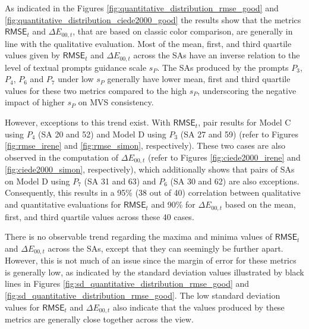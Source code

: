 As indicated in the Figures \ref{fig:quantitative_distribution_rmse_good} and \ref{fig:quantitative_distribution_ciede2000_good} the results show that the metrics $\mathsf{RMSE}_{t}$ and $\Delta E_{00,t}$, that are based on classic color comparison, are generally in line with the qualitative evaluation. Most of the mean, first, and third quartile values given by $\mathsf{RMSE}_{t}$ and $\Delta E_{00,t}$ across the SAs have an inverse relation to the level of textual prompts guidance scale $s_P$. The SAs produced by the prompts $P_3$, $P_4$, $P_6$ and $P_7$ under low $s_P$ generally have lower mean, first and third quartile values for these two metrics compared to the high $s_P$, underscoring the negative impact of higher $s_P$ on MVS consistency.

However, exceptions to this trend exist. With $\mathsf{RMSE}_{t}$, pair results for Model C using $P_4$ (SA 20 and 52) and Model D using $P_3$ (SA 27 and 59) (refer to Figures \ref{fig:rmse_irene} and \ref{fig:rmse_simon}, respectively). These two cases are also observed in the computation of $\Delta E_{00,t}$ (refer to Figures \ref{fig:ciede2000_irene} and \ref{fig:ciede2000_simon}, respectively), which additionally shows that pairs of SAs on Model D using $P_7$ (SA 31 and 63) and $P_6$ (SA 30 and 62) are also exceptions. Consequently, this results in a 95\% (38 out of 40) correlation between qualitative and quantitative evaluations for $\mathsf{RMSE}_{t}$ and 90\% for $\Delta E_{00,t}$ based on the mean, first, and third quartile values across these 40 cases.

There is no observable trend regarding the maxima and minima values of $\mathsf{RMSE}_{t}$ and $\Delta E_{00,t}$ across the SAs, except that they can seemingly be further apart. However, this is not much of an issue since the margin of error for these metrics is generally low, as indicated by the standard deviation values illustrated by black lines in Figures \ref{fig:sd_quantitative_distribution_rmse_good} and \ref{fig:sd_quantitative_distribution_rmse_good}. The low standard deviation values for $\mathsf{RMSE}_{t}$ and $\Delta E_{00,t}$ also indicate that the values produced by these metrics are generally close together across the view.


